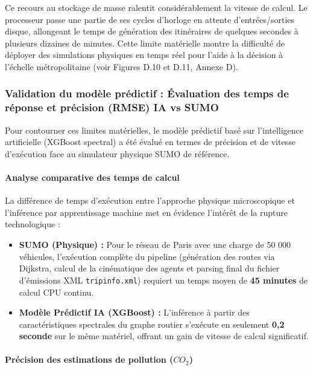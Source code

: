 \documentclass[10pt, a4paper]{article}
\providecommand{\tightlist}{}
\begin{document}
Ce recours au stockage de masse ralentit considérablement la vitesse de
calcul. Le processeur passe une partie de ses cycles d'horloge en
attente d'entrées/sorties disque, allongeant le temps de génération des
itinéraires de quelques secondes à plusieurs dizaines de minutes. Cette
limite matérielle montre la difficulté de déployer des simulations
physiques en temps réel pour l'aide à la décision à l'échelle
métropolitaine (voir Figures D.10 et D.11, Annexe D).

\subsubsection{Validation du modèle prédictif : Évaluation des temps de
réponse et précision (RMSE) IA vs
SUMO}\label{validation-du-moduxe8le-pruxe9dictif-uxe9valuation-des-temps-de-ruxe9ponse-et-pruxe9cision-rmse-ia-vs-sumo}

Pour contourner ces limites matérielles, le modèle prédictif basé sur
l'intelligence artificielle (XGBoost spectral) a été évalué en termes de
précision et de vitesse d'exécution face au simulateur physique SUMO de
référence.

\paragraph{Analyse comparative des temps de
calcul}\label{analyse-comparative-des-temps-de-calcul}

La différence de temps d'exécution entre l'approche physique
microscopique et l'inférence par apprentissage machine met en évidence
l'intérêt de la rupture technologique :

\begin{itemize}
\tightlist
\item
  \textbf{SUMO (Physique) :} Pour le réseau de Paris avec une charge de
  50 000 véhicules, l'exécution complète du pipeline (génération des
  routes via Dijkstra, calcul de la cinématique des agents et parsing
  final du fichier d'émissions XML \texttt{tripinfo.xml}) requiert un
  temps moyen de \textbf{45 minutes} de calcul CPU continu.
\item
  \textbf{Modèle Prédictif IA (XGBoost) :} L'inférence à partir des
  caractéristiques spectrales du graphe routier s'exécute en seulement
  \textbf{0,2 seconde} sur le même matériel, offrant un gain de vitesse
  de calcul significatif.
\end{itemize}

\paragraph{\texorpdfstring{Précision des estimations de pollution
(\(CO_2\))}{Précision des estimations de pollution (CO\_2)}}\label{pruxe9cision-des-estimations-de-pollution-co_2}
\end{document}
